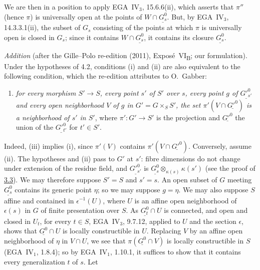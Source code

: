 We are then in a position to apply EGA~IV\(_3\), 15.6.6(ii), which asserts
that \(\pi''\) (hence \(\pi\)) is universally open at the points of
\(W\cap\underline{G_s^0}\). But, by EGA~IV\(_3\), 14.3.3.1(ii), the subset of
\(G_s\) consisting of the points at which \(\pi\) is universally open is
closed in \(G_s\); since it contains \(W\cap\underline{G_s^0}\), it contains
its closure \(\underline{G_s^0}\).

\medskip\noindent
\emph{Addition} (after the Gille--Polo re-edition (2011), Expos\'e~VI\textsubscript{B}; our
formulation). Under the hypotheses of 4.2, conditions \textup{(i)} and \textup{(ii)} are also equivalent
to the following condition, which the re-edition attributes to O.~Gabber:
\begin{enumerate}
\item[\textup{(iii)}]\label{concl:sga3-VIB-4.2-iii} \emph{for every morphism \(S'\to S\), every point
  \(s'\) of \(S'\) over \(s\), every point \(g\) of \(\underline{G'^0_{s'}}\) and every open
  neighborhood \(V\) of \(g\) in \(G'=G\times_SS'\), the set \(\pi'(V\cap\underline{G'^0})\) is a
  neighborhood of \(s'\) in \(S'\)}, where \(\pi':G'\to S'\) is the projection and
  \(\underline{G'^0}\) the union of the \(\underline{G'^0_{t'}}\) for \(t'\in S'\).
\end{enumerate}
Indeed, \textup{(iii)} implies \textup{(i)}, since \(\pi'(V)\) contains \(\pi'(V\cap\underline{G'^0})\).
Conversely, assume \textup{(ii)}. The hypotheses and \textup{(ii)} pass to \(G'\) at \(s'\): fibre
dimensions do not change under extension of the residue field, and \(\underline{G'^0_{s'}}\) is
\(\underline{G_s^0}\otimes_{\kappa(s)}\kappa(s')\) (see the proof of \hyperref[prop:sga3-VIB-3.3]{3.3}). We may therefore
suppose \(S'=S\) and \(s'=s\). An open subset of \(G\) meeting \(\underline{G_s^0}\) contains its generic
point \(\eta\); so we may suppose \(g=\eta\). We may also suppose \(S\) affine and contained in
\(\epsilon^{-1}(U)\), where \(U\) is an affine open neighborhood of \(\epsilon(s)\) in \(G\) of finite
presentation over \(S\). As \(\underline{G_t^0}\cap U\) is connected, and open and closed in \(U_t\), for
every \(t\in S\), EGA~IV\(_3\), 9.7.12, applied to \(U\) and the section \(\epsilon\), shows that
\(\underline{G^0}\cap U\) is locally constructible in \(U\). Replacing \(V\) by an affine open
neighborhood of \(\eta\) in \(V\cap U\), we see that \(\pi(\underline{G^0}\cap V)\) is locally
constructible in \(S\) (EGA~IV\(_1\), 1.8.4); so by EGA~IV\(_1\), 1.10.1, it suffices to show that it
contains every generalization \(t\) of \(s\). Let
